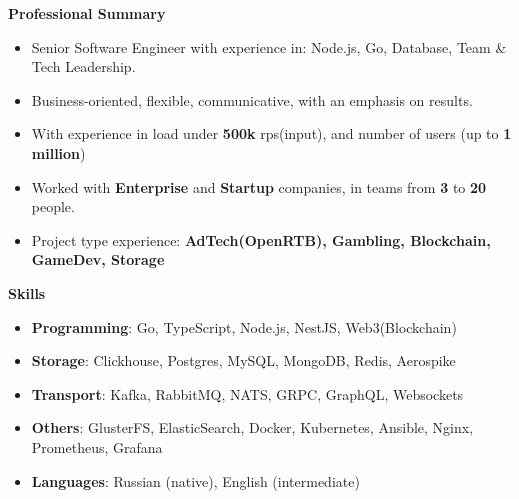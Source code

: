 \documentclass{resume}
\begin{document}

\begin{rSection}{\textbf{Professional Summary}}
{
    \begin{itemize}
    \setlength\itemsep{-0.2em}
        \item Senior Software Engineer with experience in: Node.js, Go, Database, Team \& Tech Leadership.
        \item Business-oriented, flexible, communicative, with an emphasis on results.
        \item With experience in load under \textbf{500k} rps(input), and  number of users (up to \textbf{1 million})
        \item Worked with \textbf{Enterprise} and \textbf{Startup} companies, in teams from \textbf{3} to \textbf{20} people.
        \item Project type experience: \textbf{AdTech(OpenRTB), Gambling, Blockchain, GameDev, Storage}
    \end{itemize}
}

\end{rSection}
\begin{rSection}{\textbf{Skills}}
    \begin{itemize}
    \setlength\itemsep{-0.2em}
        \item \textbf{Programming}: Go, TypeScript, Node.js, NestJS, Web3(Blockchain)
        \item \textbf{Storage}: Clickhouse, Postgres, MySQL, MongoDB, Redis, Aerospike
        \item \textbf{Transport}: Kafka, RabbitMQ, NATS, GRPC, GraphQL, Websockets
        \item \textbf{Others}: GlusterFS, ElasticSearch, Docker, Kubernetes, Ansible, Nginx, Prometheus, Grafana
        \item \textbf{Languages}: Russian (native), English (intermediate)
    \end{itemize}
\end{rSection}
\end{document}
